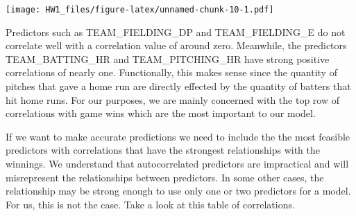 \documentclass[
]{article}
\begin{document}
\texttt{[image: HW1\_files/figure-latex/unnamed-chunk-10-1.pdf]}

Predictors such as TEAM\_FIELDING\_DP and TEAM\_FIELDING\_E do not
correlate well with a correlation value of around zero. Meanwhile, the
predictors TEAM\_BATTING\_HR and TEAM\_PITCHING\_HR have strong positive
correlations of nearly one. Functionally, this makes sense since the
quantity of pitches that gave a home run are directly effected by the
quantity of batters that hit home runs. For our purposes, we are mainly
concerned with the top row of correlations with game wins which are the
most important to our model.

If we want to make accurate predictions we need to include the the most
feasible predictors with correlations that have the strongest
relationships with the winnings. We understand that autocorrelated
predictors are impractical and will misrepresent the relationships
between predictors. In some other cases, the relationship may be strong
enough to use only one or two predictors for a model. For us, this is
not the case. Take a look at this table of correlations.
\end{document}
